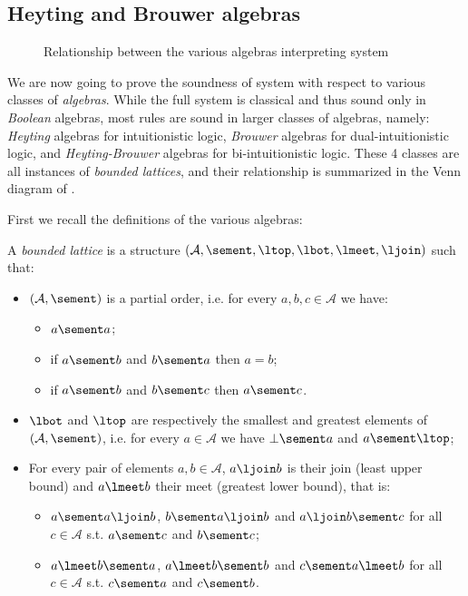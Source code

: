 \subsection{Heyting and Brouwer algebras}

\begin{figure*}
  \caption{Relationship between the various algebras interpreting system }
\end{figure*}

We are now going to prove the soundness of system  with respect to
various classes of \emph{algebras}. While the full system is classical and thus
sound only in \emph{Boolean} algebras, most rules are sound in larger classes of
algebras, namely: \emph{Heyting} algebras for intuitionistic logic,
\emph{Brouwer} algebras for dual-intuitionistic logic, and
\emph{Heyting-Brouwer} algebras for bi-intuitionistic logic. These 4 classes are
all instances of \emph{bounded lattices}, and their relationship is summarized
in the Venn diagram of .

First we recall the definitions of the various algebras:

\begin{definition}
  A \emph{bounded lattice} is a structure $(\mathcal{A}, \sement, \ltop, \lbot, \lmeet,
  \ljoin)$ such that:
  \begin{itemize}
    \item $(\mathcal{A}, \sement)$ is a partial order, i.e. for every $a, b, c
    \in \mathcal{A}$ we have:
      \begin{itemize}
        \item $a \sement a$;
        \item if $a \sement b$ and $b \sement a$ then $a = b$;
        \item if $a \sement b$ and $b \sement c$ then $a \sement c$.
      \end{itemize}
    \item $\lbot$ and $\ltop$ are respectively the smallest and greatest
    elements of $(\mathcal{A}, \sement)$, i.e. for every $a \in \mathcal{A}$ we
    have $\bot \sement a$ and $a \sement \ltop$;
    \item For every pair of elements $a, b \in \mathcal{A}$, $a \ljoin b$ is
    their join (least upper bound) and $a \lmeet b$ their meet (greatest lower
    bound), that is:
    \begin{itemize}
      \item $a \sement a \ljoin b$, $b \sement a \ljoin b$ and $a \ljoin b \sement c$ for all $c \in \mathcal{A}$ s.t. $a \sement c$ and $b \sement c$;
      \item $a \lmeet b \sement a$, $a \lmeet b \sement b$ and $c \sement a \lmeet b$ for all $c \in \mathcal{A}$ s.t. $c \sement a$ and $c \sement b$.
    \end{itemize}
  \end{itemize}
\end{definition}

